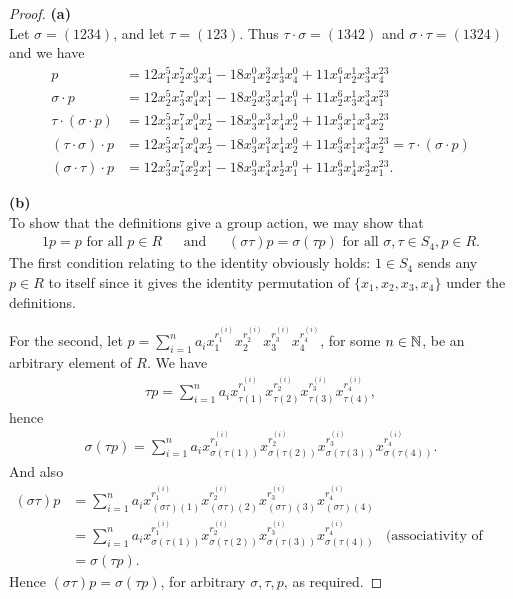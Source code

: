 \begin{proof}
  {\bf (a)}\\
  Let $\sigma = (1 2 3 4)$, and let $\tau = (1 2 3)$. Thus $\tau \cdot \sigma = (1342)$ and
  $\sigma \cdot \tau = (1324)$ and we have
  \begin{align*}
    p          &= 12x_1^5x_2^7x_3^0x_4^1 - 18x_1^0x_2^3x_3^1x_4^0 + 11x_1^6x_2^1x_3^3x_4^{23}\\
    \sigma \cdot p      &= 12x_2^5x_3^7x_4^0x_1^1 - 18x_2^0x_3^3x_4^1x_1^0 + 11x_2^6x_3^1x_4^3x_1^{23} \\
    \tau \cdot (\sigma \cdot p) &= 12x_3^5x_1^7x_4^0x_2^1 - 18x_3^0x_1^3x_4^1x_2^0 + 11x_3^6x_1^1x_4^3x_2^{23} \\
    (\tau \cdot \sigma) \cdot p &= 12x_3^5x_1^7x_4^0x_2^1 - 18x_3^0x_1^3x_4^1x_2^0 + 11x_3^6x_1^1x_4^3x_2^{23} =  \tau \cdot (\sigma \cdot p)\\
    (\sigma \cdot \tau) \cdot p &= 12x_3^5x_4^7x_2^0x_1^1 - 18x_3^0x_4^3x_2^1x_1^0 + 11x_3^6x_4^1x_2^3x_1^{23}.
  \end{align*}


  {\bf (b)}\\
  To show that the definitions give a group action, we may show that
  \begin{align*}
    1p = p \text{~for all~} p \in R ~~~~~~~\text{and}~~~~~~~ (\sigma\tau) p = \sigma(\tau p) \text{~for all~} \sigma, \tau \in S_4, p \in R.
  \end{align*}
  The first condition relating to the identity obviously holds: $1 \in S_4$ sends any $p \in R$ to itself since it gives
  the identity permutation of $\{ x_1, x_2, x_3, x_4 \}$ under the definitions.

  For the second, let $p = \sum_{i=1}^n a_ix_1^{r_1^{(i)}} x_2^{r_2^{(i)}} x_3^{r_3^{(i)}} x_4^{r_4^{(i)}}$, for some $n \in \mathbb{N}$, be an arbitrary element of $R$.
  We have
  \begin{align*}
    \tau p = \sum_{i=1}^n a_ix_{\tau(1)}^{r_1^{(i)}} x_{\tau(2)}^{r_2^{(i)}} x_{\tau(3)}^{r_3^{(i)}} x_{\tau(4)}^{r_4^{(i)}},
  \end{align*}
  hence
  \begin{align*}
    \sigma(\tau p) = \sum_{i=1}^n a_ix_{\sigma(\tau(1))}^{r_1^{(i)}} x_{\sigma(\tau(2))}^{r_2^{(i)}} x_{\sigma(\tau(3))}^{r_3^{(i)}} x_{\sigma(\tau(4))}^{r_4^{(i)}}.
  \end{align*}
  And also
  \begin{align*}
    (\sigma\tau)p &= \sum_{i=1}^n a_ix_{(\sigma\tau)(1)}^{r_1^{(i)}} x_{(\sigma\tau)(2)}^{r_2^{(i)}} x_{(\sigma\tau)(3)}^{r_3^{(i)}} x_{(\sigma\tau)(4)}^{r_4^{(i)}} \\
    &= \sum_{i=1}^n a_ix_{\sigma(\tau(1))}^{r_1^{(i)}} x_{\sigma(\tau(2))}^{r_2^{(i)}} x_{\sigma(\tau(3))}^{r_3^{(i)}} x_{\sigma(\tau(4))}^{r_4^{(i)}} &\text{(associativity of function composition)}\\
    &= \sigma(\tau p).
  \end{align*}
  Hence $(\sigma\tau)p = \sigma(\tau p)$, for arbitrary $\sigma, \tau, p$, as required.


\end{proof}
